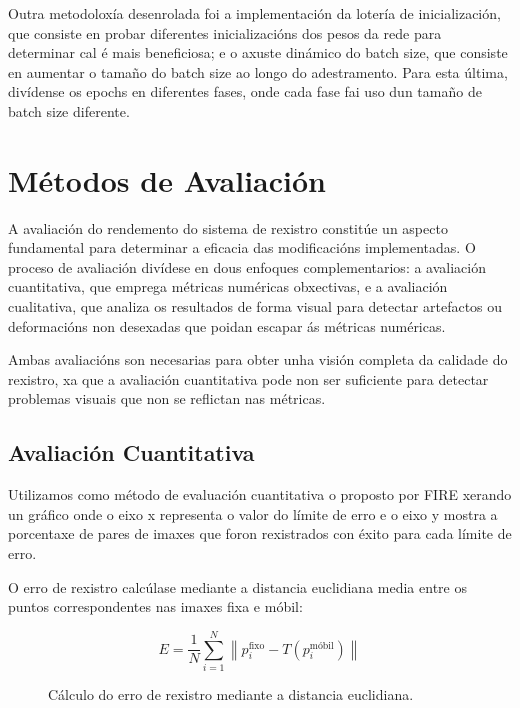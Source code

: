 Outra metodoloxía desenrolada foi a implementación da lotería de inicialización, que consiste en probar diferentes inicializacións dos pesos da rede para determinar cal é mais beneficiosa; e o axuste dinámico do batch size, que consiste en aumentar o tamaño do batch size ao longo do adestramento.
Para esta última, divídense os epochs en diferentes fases, onde cada fase fai uso dun tamaño de batch size diferente.

\section{Métodos de Avaliación}
\label{sec:Métodos de Avaliación}

A avaliación do rendemento do sistema de rexistro constitúe un aspecto fundamental para determinar a eficacia das modificacións implementadas. 
O proceso de avaliación divídese en dous enfoques complementarios: a avaliación cuantitativa, que emprega métricas numéricas obxectivas, e a avaliación cualitativa, que analiza os resultados de forma visual para detectar artefactos ou deformacións non desexadas que poidan escapar ás métricas numéricas.

 Ambas avaliacións son necesarias para obter unha visión completa da calidade do rexistro, xa que a avaliación cuantitativa pode non ser suficiente para detectar problemas visuais que non se reflictan nas métricas.

 \subsection{Avaliación Cuantitativa}
 \label{subsec:Avaliación Cuantitativa}
 
 Utilizamos como método de evaluación cuantitativa o proposto por FIRE \cite{FIRE}
 xerando un gráfico onde o eixo x representa o valor do límite de erro e o eixo y mostra a porcentaxe de pares de imaxes que foron rexistrados con éxito para cada límite de erro.
 
O erro de rexistro calcúlase mediante a distancia euclidiana media entre os puntos correspondentes nas imaxes fixa e móbil:

\begin{figure}[ht!]
    \centering
    \[
    E = \frac{1}{N} \sum_{i=1}^{N} \left\| p_i^{\text{fixo}} - T(p_i^{\text{móbil}}) \right\|
    \]
    \caption{Cálculo do erro de rexistro mediante a distancia euclidiana.}
    \label{fig:erro_registro}
\end{figure}

